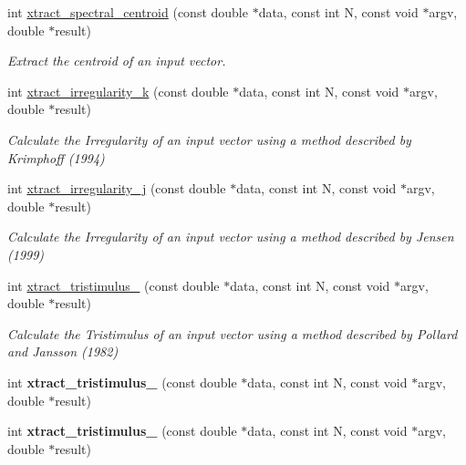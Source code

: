 \begin{DoxyCompactItemize}
int \hyperlink{group__scalar_ga6d3a8d2a246ac82332ac0640f925164b}{xtract\-\_\-spectral\-\_\-centroid} (const double $\ast$data, const int N, const void $\ast$argv, double $\ast$result)
\begin{DoxyCompactList}\small\item\em Extract the centroid of an input vector. \end{DoxyCompactList}\item 
int \hyperlink{group__scalar_ga2d92598203a789993ccc2e2f797356b5}{xtract\-\_\-irregularity\-\_\-k} (const double $\ast$data, const int N, const void $\ast$argv, double $\ast$result)
\begin{DoxyCompactList}\small\item\em Calculate the Irregularity of an input vector using a method described by Krimphoff (1994) \end{DoxyCompactList}\item 
int \hyperlink{group__scalar_ga191fed1a9d49bb9902293112e4e9624b}{xtract\-\_\-irregularity\-\_\-j} (const double $\ast$data, const int N, const void $\ast$argv, double $\ast$result)
\begin{DoxyCompactList}\small\item\em Calculate the Irregularity of an input vector using a method described by Jensen (1999) \end{DoxyCompactList}\item 
int \hyperlink{group__scalar_ga3af1c86337fabebe8ebebddb525d63b6}{xtract\-\_\-tristimulus\-\_} (const double $\ast$data, const int N, const void $\ast$argv, double $\ast$result)
\begin{DoxyCompactList}\small\item\em Calculate the Tristimulus of an input vector using a method described by Pollard and Jansson (1982) \end{DoxyCompactList}\item 
\hypertarget{group__scalar_ga59ca3e4287f3fbdc613960ac262b7a77}{int {\bfseries xtract\-\_\-tristimulus\-\_} (const double $\ast$data, const int N, const void $\ast$argv, double $\ast$result)}\label{group__scalar_ga59ca3e4287f3fbdc613960ac262b7a77}

\item 
\hypertarget{group__scalar_gaa9fe4d022b25994ea4c5a9a04cc6c819}{int {\bfseries xtract\-\_\-tristimulus\-\_} (const double $\ast$data, const int N, const void $\ast$argv, double $\ast$result)}\label{group__scalar_gaa9fe4d022b25994ea4c5a9a04cc6c819}


\end{DoxyCompactItemize}
